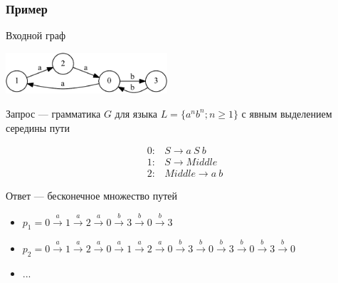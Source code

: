\documentclass[xcolor=table,aspectratio=169]{beamer}
\begin{document}
\begin{frame}[fragile]
  \transwipe[direction=90]
  \frametitle{Пример}
Входной граф \\
\begin{center}
        \includegraphics[width=0.45\textwidth]{pictures/input.pdf} 
\end{center}
Запрос --- грамматика $G$ для языка $L=\{a^n b^n; n \geq 1\}$ с явным выделением середины пути \\
\begin{center}
   \[
\begin{array}{rl} 
   0:& S \rightarrow a \ S \ b \\
   1:& S \rightarrow Middle \\
   2:& Middle \rightarrow a \ b
\end{array}
\]
\end{center}
\vspace{0.8em}
Ответ --- бесконечное множество путей
\begin{itemize}
\item $p_1 = 0\xrightarrow{a}1\xrightarrow{a}2\xrightarrow{a}0\xrightarrow{b}3\xrightarrow{b}0\xrightarrow{b}3$
\item $p_2 = 0\xrightarrow{a}1\xrightarrow{a}2\xrightarrow{a}0\xrightarrow{a}1\xrightarrow{a}2\xrightarrow{a}0\xrightarrow{b}3\xrightarrow{b}0\xrightarrow{b}3\xrightarrow{b}0\xrightarrow{b}3\xrightarrow{b}0$
\item ...
\end{itemize}

\end{frame}
\end{document}
